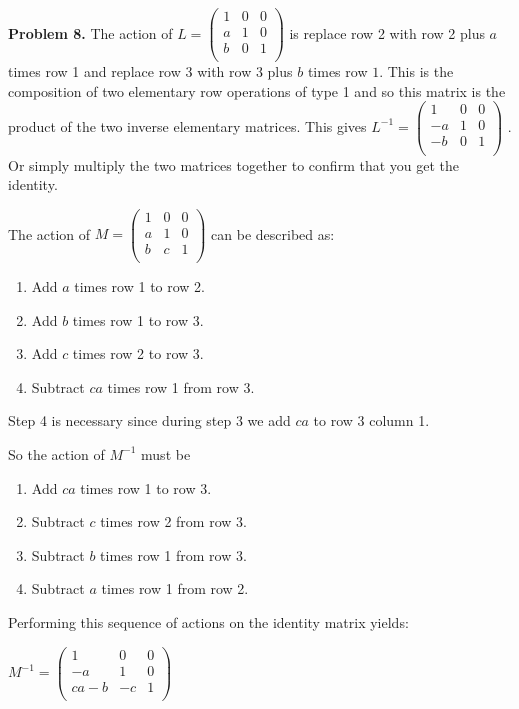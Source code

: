 \documentclass[oneside,12pt]{amsart}
\begin{document}
\bigskip

\textbf{Problem 8.} The action of
$
L=
\begin{pmatrix}
1 & 0  & 0 \\
a & 1  & 0 \\
b & 0  & 1\\
\end{pmatrix}
$
is replace row 2 with row 2 plus $a$ times row 1 and replace row 3 with
row 3 plus $b$ times row $1$. This is the composition of two elementary
row operations of type 1 and so this matrix is the product of the two
inverse elementary matrices. This gives
$
L^{-1}=
\begin{pmatrix}
1 & 0  & 0 \\
-a & 1  & 0 \\
-b & 0  & 1\\
\end{pmatrix}
$
.
Or simply multiply the two matrices together to confirm that you get
the identity.

The action of
$
M=
\begin{pmatrix}
1 & 0  & 0 \\
a & 1  & 0 \\
b & c  & 1\\
\end{pmatrix}
$
can be described as:
\begin{enumerate}
\item Add $a$ times row 1 to row 2.
\item Add $b$ times row 1 to row 3.
\item Add $c$ times row 2 to row 3.
\item Subtract $ca$ times row 1 from row 3.
\end{enumerate}

Step 4 is necessary since during step 3 we add $ca$ to row 3 column 1.

So the action of $M^{-1}$ must be
\begin{enumerate}
\item Add $ca$ times row 1 to row 3.
\item Subtract $c$ times row 2 from row 3.
\item Subtract $b$ times row 1 from row 3.
\item Subtract $a$ times row 1 from row 2.
\end{enumerate}

Performing this sequence of actions on the identity matrix yields:

$
M^{-1}=
\begin{pmatrix}
1      &  0  & 0 \\
-a      &  1  & 0 \\
ca - b & -c  & 1\\
\end{pmatrix}
$
\end{document}
